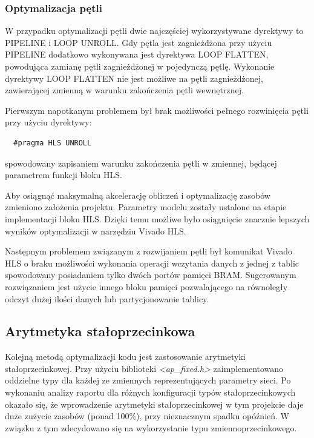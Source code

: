 \subsubsection{Optymalizacja pętli}

W przypadku optymalizacji pętli dwie najczęściej wykorzystywane dyrektywy to PIPELINE i LOOP UNROLL. Gdy pętla jest zagnieżdżona przy użyciu PIPELINE dodatkowo wykonywana jest dyrektywa LOOP FLATTEN, powodująca zamianę pętli zagnieżdżonej w pojedynczą pętlę. Wykonanie dyrektywy LOOP FLATTEN nie jest możliwe na pętli zagnieżdżonej, zawierającej zmienną w warunku zakończenia pętli wewnętrznej.

Pierwszym napotkanym problemem był brak możliwości pełnego rozwinięcia pętli przy użyciu dyrektywy:
\begin{verbatim}
  #pragma HLS UNROLL
\end{verbatim}
spowodowany zapisaniem warunku zakończenia pętli w zmiennej, będącej parametrem funkcji bloku HLS. 


Aby osiągnąć maksymalną akcelerację obliczeń i optymalizację zasobów zmieniono założenia projektu. Parametry modelu zostały ustalone na etapie implementacji bloku HLS. Dzięki temu możliwe było osiągnięcie znacznie lepszych wyników optymalizacji w narzędziu Vivado HLS.

Następnym problemem związanym z rozwijaniem pętli był komunikat Vivado HLS o braku możliwości wykonania operacji wczytania danych z jednej z tablic spowodowany posiadaniem tylko dwóch portów pamięci BRAM. Sugerowanym rozwiązaniem jest użycie innego bloku pamięci pozwalającego na równoległy odczyt dużej ilości danych lub partycjonowanie tablicy.

\subsection{Arytmetyka stałoprzecinkowa}

Kolejną metodą optymalizacji kodu jest zastosowanie arytmetyki stałoprzecinkowej. Przy użyciu biblioteki \emph{<ap\_fixed.h>} zaimplementowano oddzielne typy dla każdej ze zmiennych reprezentujących parametry sieci. Po wykonaniu analizy raportu dla różnych konfiguracji typów stałoprzecinkowych okazało się, że wprowadzenie arytmetyki stałoprzecinkowej w tym projekcie daje duże zużycie zasobów (ponad 100\%), przy nieznacznym spadku opóźnień. W związku z tym zdecydowano się na wykorzystanie typu zmiennoprzecinkowego.

